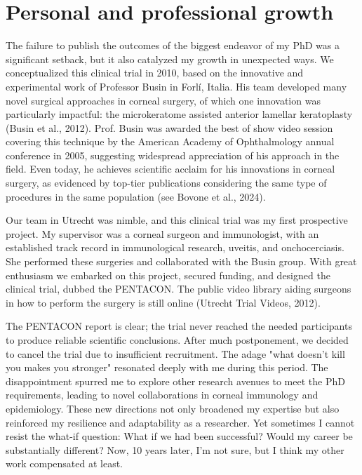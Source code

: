\documentclass[authordate, reflection]{jote-new-article}
\author[1]{\mbox{Robert P. L. Wisse\orcid{0000-0002-2844-9868}}}
\affil[1]{University Medical Center, Utrecht, the Netherlands}
\begin{document}
\begin{frontmatter}
  \maketitle
  \begin{abstract}
    \printabstracttext
  \end{abstract}
\end{frontmatter}




	\section{Personal and professional growth}



	The failure to publish the outcomes of the biggest endeavor of my PhD was a significant setback, but it also catalyzed my growth in unexpected ways. We conceptualized this clinical trial in 2010, based on the innovative and experimental work of Professor Busin in Forlí, Italia. His team developed many novel surgical approaches in corneal surgery, of which one innovation was particularly impactful: the microkeratome assisted anterior lamellar keratoplasty (Busin et al., 2012). Prof. Busin was awarded the best of show video session covering this technique by the American Academy of Ophthalmology annual conference in 2005, suggesting widespread appreciation of his approach in the field. Even today, he achieves scientific acclaim for his innovations in corneal surgery, as evidenced by top-tier publications considering the same type of procedures in the same population (see Bovone et al., 2024).



	Our team in Utrecht was nimble, and this clinical trial was my first prospective project. My supervisor was a corneal surgeon and immunologist, with an established track record in immunological research, uveitis, and onchocerciasis. She performed these surgeries and collaborated with the Busin group. With great enthusiasm we embarked on this project, secured funding, and designed the clinical trial, dubbed the PENTACON. The public video library aiding surgeons in how to perform the surgery is still online (Utrecht Trial Videos, 2012).



	The PENTACON report is clear; the trial never reached the needed participants to produce reliable scientific conclusions. After much postponement, we decided to cancel the trial due to insufficient recruitment. The adage "what doesn't kill you makes you stronger" resonated deeply with me during this period. The disappointment spurred me to explore other research avenues to meet the PhD requirements, leading to novel collaborations in corneal immunology and epidemiology. These new directions not only broadened my expertise but also reinforced my resilience and adaptability as a researcher. Yet sometimes I cannot resist the what-if question: What if we had been successful? Would my career be substantially different? Now, 10 years later, I'm not sure, but I think my other work compensated at least.
\end{document}
